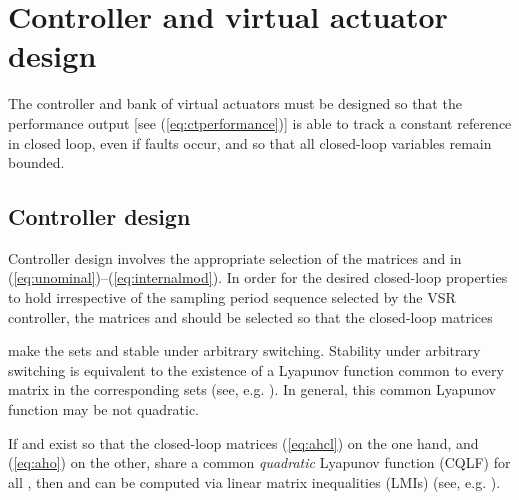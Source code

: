 \documentclass[letterpaper, 10 pt, conference]{ieeeconf}
\begin{document}
\section{Controller and virtual actuator design}
\label{sec:VA}

The controller and bank of virtual actuators must be designed so that
the performance output  [see (\ref{eq:ctperformance})] is able to
track a constant reference in closed loop, even if faults occur, and
so that all closed-loop variables remain bounded.

\subsection{Controller design}
\label{sec:contr-des}


Controller design involves the appropriate selection of the matrices
 and  in (\ref{eq:unominal})--(\ref{eq:internalmod}). In
order for the desired closed-loop properties to hold irrespective of
the sampling period sequence selected by the VSR controller, the
matrices  and  should be selected so that the closed-loop
matrices

make the sets  and  stable under arbitrary switching. Stability under
arbitrary switching is equivalent to the existence of a Lyapunov
function common to every matrix in the corresponding sets (see,
e.g. \cite{showir_siamrev07,lin09:_stabil}). In general, this common
Lyapunov function may be not quadratic.


If  and  exist so that the closed-loop matrices (\ref{eq:ahcl}) on the one hand, and (\ref{eq:aho}) on the other, share a common \emph{quadratic} Lyapunov function (CQLF) for all , then  and  can be computed via linear matrix inequalities (LMIs) (see, e.g. \cite{daafouz02_stabil,sala05_vsrlmi}). 
\end{document}
